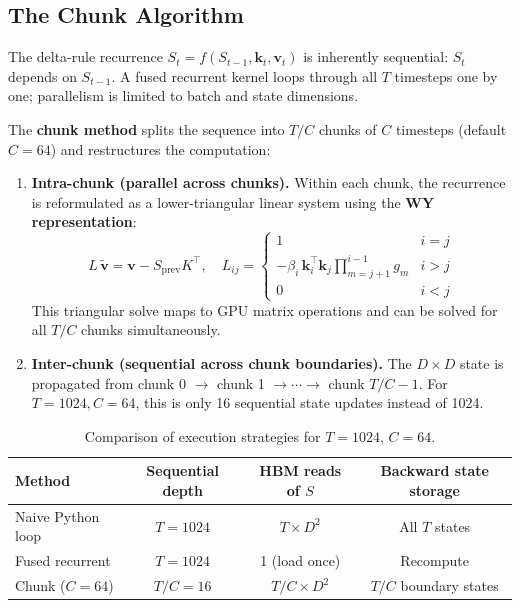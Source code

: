 \documentclass[11pt,a4paper]{article}
\begin{document}
\subsection{The Chunk Algorithm}
\label{sec:chunk}

The delta-rule recurrence $S_t = f(S_{t-1}, \mathbf{k}_t, \mathbf{v}_t)$ is inherently sequential: $S_t$ depends on $S_{t-1}$.
A fused recurrent kernel loops through all $T$ timesteps one by one; parallelism is limited to batch and state dimensions.

The \textbf{chunk method} splits the sequence into $T/C$ chunks of $C$ timesteps (default $C=64$) and restructures the computation:

\begin{enumerate}
\item \textbf{Intra-chunk (parallel across chunks).}
Within each chunk, the recurrence is reformulated as a lower-triangular linear system using the \textbf{WY representation}:
\[
L \, \tilde{\mathbf{v}} = \mathbf{v} - S_{\text{prev}} K^\top, \quad
L_{ij} = \begin{cases} 1 & i = j \\ -\beta_i \, \mathbf{k}_i^\top \mathbf{k}_j \prod_{m=j+1}^{i-1} g_m & i > j \\ 0 & i < j \end{cases}
\]
This triangular solve maps to GPU matrix operations and can be solved for all $T/C$ chunks simultaneously.

\item \textbf{Inter-chunk (sequential across chunk boundaries).}
The $D \times D$ state is propagated from chunk 0 $\to$ chunk 1 $\to \cdots \to$ chunk $T/C-1$.
For $T=1024, C=64$, this is only 16 sequential state updates instead of 1024.
\end{enumerate}

\begin{table}[h]
\centering
\caption{Comparison of execution strategies for $T=1024$, $C=64$.}
\label{tab:strategies}
\begin{tabular}{lccc}
\toprule
\textbf{Method} & \textbf{Sequential depth} & \textbf{HBM reads of $S$} & \textbf{Backward state storage} \\
\midrule
Naive Python loop & $T = 1024$ & $T \times D^2$ & All $T$ states \\
Fused recurrent & $T = 1024$ & 1 (load once) & Recompute \\
Chunk ($C=64$) & $T/C = 16$ & $T/C \times D^2$ & $T/C$ boundary states \\
\bottomrule
\end{tabular}
\end{table}
\end{document}

